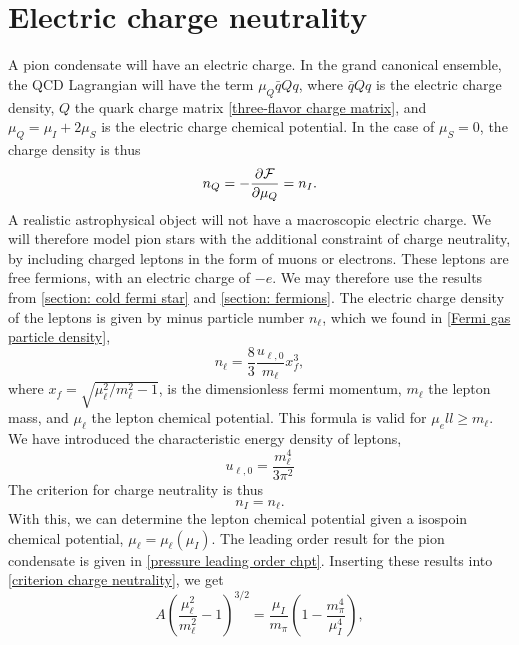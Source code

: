 \section{Electric charge neutrality}


A pion condensate will have an electric charge.
In the grand canonical ensemble, the QCD Lagrangian will have the term  $\mu_Q \bar q Q q$, where $\bar q Q q$ is the electric charge density, $Q$ the quark charge matrix \autoref{three-flavor charge matrix}, and $\mu_Q = \mu_I + 2 \mu_S$ is the electric charge chemical potential.
In the case of $\mu_S = 0$, the charge density is thus
%
\begin{equation}
    n_Q = - \pdv{\mathcal{F}}{\mu_Q} = n_I.
\end{equation}
%
A realistic astrophysical object will not have a macroscopic electric charge.
We will therefore model pion stars with the additional constraint of charge neutrality, by including charged leptons in the form of muons or electrons.
These leptons are free fermions, with an electric charge of $- e$.
We may therefore use the results from \autoref{section: cold fermi star} and \autoref{section: fermions}.
The electric charge density of the leptons is given by minus particle number $n_\ell$, which we found in \autoref{Fermi gas particle density},
%
\begin{equation}
    n_{\ell} = \frac{8}{3} 
    \frac{u_{\ell, 0}}{m_\ell} x_f^3,
\end{equation}
%
where $x_f = \sqrt{ {\mu_\ell^2}/{m_\ell^2} - 1}$, is the dimensionless fermi momentum, $m_\ell$ the lepton mass, and $\mu_\ell$ the lepton chemical potential.
This formula is valid for $\mu_ell \geq m_\ell$.
We have introduced the characteristic energy density of leptons,
%
\begin{equation}
    u_{\ell, 0} = \frac{m^4_\ell}{3 \pi^2}
\end{equation}
%
The criterion for charge neutrality is thus
%
\begin{equation}
    \label{criterion charge neutrality}
    n_I = n_\ell.
\end{equation}
%
With this, we can determine the lepton chemical potential given a isospoin chemical potential, $\mu_\ell = \mu_\ell(\mu_I)$.
The leading order result for the pion condensate is given in \autoref{pressure leading order chpt}.
Inserting these results into \autoref{criterion charge neutrality}, we get
%
\begin{equation}
    A \left(\frac{\mu_\ell^2 }{m_\ell^2} - 1 \right)^{3/2}
    = \frac{\mu_I}{m_\pi}\left( 1 - \frac{m_\pi^4}{\mu_I^4}  \right),
\end{equation}
